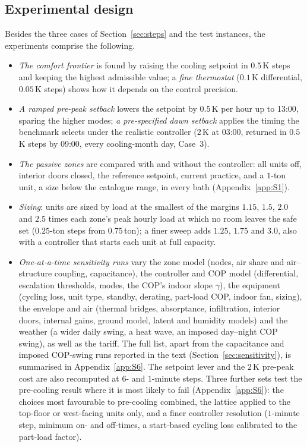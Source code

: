 \documentclass[10pt,a4paper,twocolumn]{article}
\theoremstyle{definition}
\begin{document}
\subsection{Experimental design}\label{sec:design}
Besides the three cases of Section~\ref{sec:steps} and the test instances, the experiments comprise the following.
\begin{itemize}[leftmargin=1.2em,itemsep=1pt,topsep=2pt]
\item \emph{The comfort frontier} is found by raising the cooling setpoint in $0.5\,$K steps and keeping the highest admissible value; a \emph{fine thermostat} ($0.1\,$K differential, $0.05\,$K steps) shows how it depends on the control precision.
\item \emph{A ramped pre-peak setback} lowers the setpoint by $0.5\,$K per hour up to 13:00, sparing the higher modes; \emph{a pre-specified dawn setback} applies the timing the benchmark selects under the realistic controller ($2\,$K at 03:00, returned in $0.5\,$K steps by 09:00, every cooling-month day, Case~3).
\item \emph{The passive zones} are compared with and without the controller: all units off, interior doors closed, the reference setpoint, current practice, and a $1$-ton unit, a size below the catalogue range, in every bath (Appendix~\ref{app:S1}).
\item \emph{Sizing}: units are sized by load at the smallest of the margins $1.15$, $1.5$, $2.0$ and $2.5$ times each zone's peak hourly load at which no room leaves the safe set ($0.25$-ton steps from $0.75\,$ton); a finer sweep adds $1.25$, $1.75$ and $3.0$, also with a controller that starts each unit at full capacity.
\item \emph{One-at-a-time sensitivity runs} vary the zone model (nodes, air share and air--structure coupling, capacitance), the controller and COP model (differential, escalation thresholds, modes, the COP's indoor slope $\gamma$), the equipment (cycling loss, unit type, standby, derating, part-load COP, indoor fan, sizing), the envelope and air (thermal bridges, absorptance, infiltration, interior doors, internal gains, ground model, latent and humidity models) and the weather (a wider daily swing, a heat wave, an imposed day--night COP swing), as well as the tariff. The full list, apart from the capacitance and imposed COP-swing runs reported in the text (Section~\ref{sec:sensitivity}), is summarised in Appendix~\ref{app:S6}. The setpoint lever and the $2\,$K pre-peak cost are also recomputed at $6$- and $1$-minute steps. Three further sets test the pre-cooling result where it is most likely to fail (Appendix~\ref{app:S6}): the choices most favourable to pre-cooling combined, the lattice applied to the top-floor or west-facing units only, and a finer controller resolution ($1$-minute step, minimum on- and off-times, a start-based cycling loss calibrated to the part-load factor).

\end{itemize}
\end{document}
